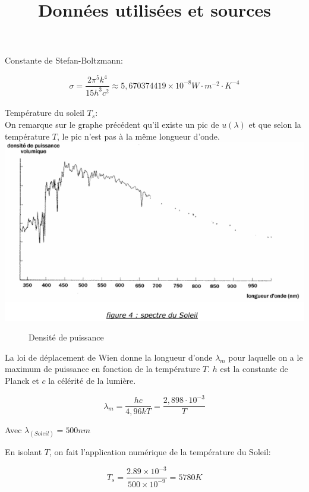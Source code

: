 \documentclass[a4paper,11pt]{article}
\title{Données utilisées et sources}
\begin{document}
\maketitle

Constante de Stefan-Boltzmann:

\[\sigma = \frac{2\pi^{5}k^{4}}{15h^{3}c^{2}} \approx 5,670374419 \times 10^{-8} W \cdot m^{-2} \cdot K ^{-4} \] \\

Température du soleil $T_s$: \\

On remarque sur le graphe précédent qu'il existe un pic de $u(\lambda)$ et que selon la température $T$, le pic n'est pas à la même longueur d'onde. \\

\begin{adjustbox}{center}
\includegraphics[scale=0.5]{densite_puissance}
\end{adjustbox}
\begin{figure}[h]
  \centering
  \caption{Densité de puissance}
\end{figure}

La loi de déplacement de Wien donne la longueur d'onde $\lambda_m$ pour laquelle on a le maximum de puissance en fonction de la température $T$. $h$ est la constante de Planck et $c$ la célérité de la lumière.

\[ \lambda_m = \dfrac{hc}{4,96kT} = \dfrac{2,898 \cdot 10^{-3}}{T} \]

Avec $\lambda_{(Soleil)} = 500 nm$

En isolant $T$, on fait l'application numérique de la température du Soleil:

\[ T_s= \dfrac{2.89 \times 10^{-3}}{500 \times 10^{-9}} = 5780 K \]
\end{document}
